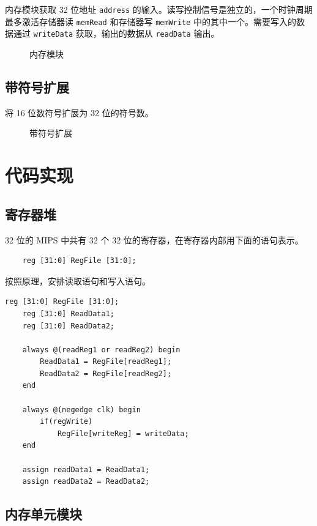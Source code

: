 \documentclass[a4paper,UTF8]{ctexart}
\begin{document}
内存模块获取 32 位地址 \verb"address" 的输入。读写控制信号是独立的，一个时钟周期最多激活存储器读 \verb"memRead" 和存储器写 \verb"memWrite" 中的其中一个。需要写入的数据通过 \verb"writeData" 获取，输出的数据从 \verb"readData" 输出。

\begin{figure}[h]
    \centering
    
    \caption{内存模块}
\end{figure}

\subsection{带符号扩展}

将 16 位数符号扩展为 32 位的符号数。

\begin{figure}[H]
    \centering
    
    \caption{带符号扩展}
\end{figure}

\section{代码实现}

\subsection{寄存器堆}

32 位的 MIPS 中共有 32 个 32 位的寄存器，在寄存器内部用下面的语句表示。
\begin{lstlisting}
    reg [31:0] RegFile [31:0];
\end{lstlisting}

按照原理，安排读取语句和写入语句。
\begin{lstlisting}[caption=Registers.v]
    reg [31:0] RegFile [31:0];
    reg [31:0] ReadData1;
    reg [31:0] ReadData2;

    always @(readReg1 or readReg2) begin
        ReadData1 = RegFile[readReg1];
        ReadData2 = RegFile[readReg2];
    end
    
    always @(negedge clk) begin
        if(regWrite)
            RegFile[writeReg] = writeData;
    end

    assign readData1 = ReadData1;
    assign readData2 = ReadData2;
\end{lstlisting}

\subsection{内存单元模块}
\end{document}

